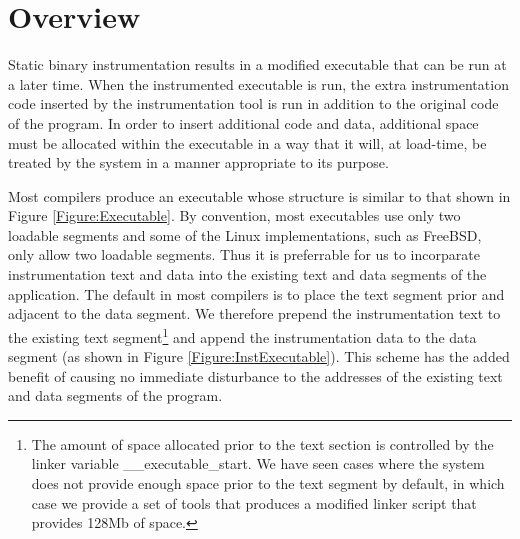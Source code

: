 \section{Overview}

Static binary instrumentation results in a modified executable 
 that can be run at a later time. When the instrumented executable is
run, the extra instrumentation code inserted by the instrumentation tool is run
in addition to the original code of the program. In order to insert additional code
and data, additional space must be allocated within the executable in a way that it
will, at load-time, be treated by the system in a manner appropriate to its
purpose. 

Most compilers produce an executable whose
structure is similar to that shown in Figure \ref{Figure:Executable}. By
convention, most executables use only two loadable segments and some of the Linux
implementations, such as FreeBSD, only allow two loadable segments. Thus it is
preferrable for us to incorparate instrumentation text and data into the
existing text and data segments of the application. The default in most
compilers is to place the text segment prior and adjacent to the data segment.
We therefore prepend the instrumentation text to the existing text
segment\footnote{The amount of space allocated prior to the text section is
controlled by the linker variable \_\_executable\_start. We have seen cases
where the system does not provide enough space prior to the text segment by
default, in which case we provide a set of tools that produces a modified linker
script that provides 128Mb of space.} and append the instrumentation data to the
data segment (as shown in Figure \ref{Figure:InstExecutable}). This
scheme has the added benefit of causing no immediate disturbance to the
addresses of the existing text and data segments of the program.

